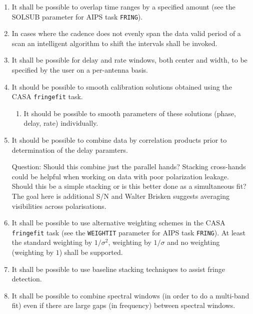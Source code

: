 \documentclass[11pt,a4paper]{article}
\begin{document}
\begin{enumerate}[subseclist]

\item It shall be possible to overlap time ranges by a specified
  amount (see the SOLSUB parameter for AIPS task \texttt{FRING}).

\item In cases where the cadence does not evenly span the data valid
  period of a scan an intelligent algorithm to shift the intervals
  shall be invoked.

\item It shall be possible for delay and rate windows, both center and
  width, to be specified by the user on a per-antenna basis.

\item It should be possible to smooth calibration solutions obtained
  using the CASA \texttt{fringefit} task.

\begin{enumerate}[subsecsublist]

\item It should be possible to smooth parameters of these solutions
  (phase, delay, rate) individually.

\end{enumerate}

\item It should be possible to combine data by correlation products
  prior to determination of the delay paramters.

  Question: Should this combine just the parallel hands?  Stacking
  cross-hands could be helpful when working on data with poor
  polarization leakage.  Should this be a simple stacking or is this
  better done as a simultaneous fit?  The goal here is additional S/N
  and Walter Brisken suggests averaging visibilities across
  polarisations.

\item It shall be possible to use alternative weighting schemes in
  the CASA \texttt{fringefit} task (see the \texttt{WEIGHTIT}
  parameter for AIPS task \texttt{FRING}).  At least the standard
  weighting by $1/\sigma^2$, weighting by $1/\sigma$ and no weighting
  (weighting by $1$) shall be supported.

\item It shall be possible to use baseline stacking techniques to
  assist fringe detection.

\item It shall be possible to combine spectral windows (in order to do
  a multi-band fit) even if there are large gaps (in frequency)
  between spectral windows.


\end{enumerate}
\end{document}
